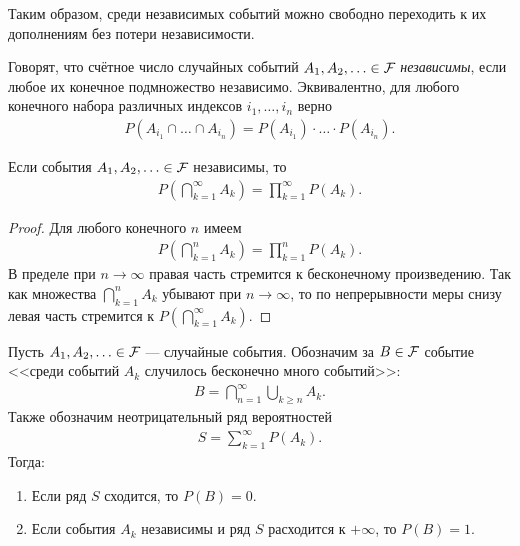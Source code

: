 \documentclass[../main.tex]{subfiles}
\begin{document}
Таким образом, среди независимых событий можно свободно переходить к их дополнениям без потери независимости.

\begin{df}
 Говорят, что счётное число случайных событий $A_1, A_2, \ldots \in \mathcal F$ \textit{независимы}, если любое их конечное подмножество независимо. Эквивалентно, для любого конечного набора различных индексов $i_1, \ldots, i_n$ верно
 \begin{align*}
  P(A_{i_1} \cap \ldots \cap A_{i_n}) = P(A_{i_1}) \cdot \ldots \cdot P(A_{i_n}).
 \end{align*} 
\end{df}
\begin{remrk}
 \label{remark:independent_infinite_product}
 Если события $A_1, A_2, \ldots \in \mathcal F$  независимы, то
 \begin{align*}
  P \left( \bigcap_{k=1}^{\infty} A_k \right) = \prod_{k=1}^{\infty} P(A_k).
 \end{align*} 
\end{remrk}
\begin{proof}
 Для любого конечного $n$ имеем
 \begin{align*}
  P \left( \bigcap_{k=1}^{n} A_k \right) = \prod_{k=1}^{n} P(A_k)
 .\end{align*} В пределе при $n \to \infty$ правая часть стремится к бесконечному произведению. Так как множества $ \bigcap_{k=1}^{n}A_k  $ убывают при $ n \to \infty $, то по непрерывности меры снизу левая часть стремится к  $ P( \bigcap_{k=1}^{\infty} A_k)  $.
\end{proof}
\begin{lm}
 \label{lemma:borel_cantelli}
 Пусть $A_1, A_2, \ldots \in \mathcal F$  --- случайные события. Обозначим за $ B \in \mathcal F$ событие <<среди событий $ A_k $ случилось бесконечно много событий>>:
 \begin{align*}
  B = \bigcap_{n=1}^{\infty} \bigcup_{k \geqslant n} A_k.
 \end{align*} Также обозначим неотрицательный ряд вероятностей
 \begin{align*}
  S = \sum_{k=1}^{\infty} P(A_k).
 \end{align*}  Тогда:
 \begin{enumerate}
  \item \label{enum1:lemma:borel_cantelli} Если ряд $ S $ сходится, то $P(B) = 0$.
  \item \label{enum2:lemma:borel_cantelli} Если события $A_k$  независимы и ряд $ S $ расходится к $ +\infty $, то $P(B) = 1$.
 \end{enumerate} 
\end{lm}
\end{document}
